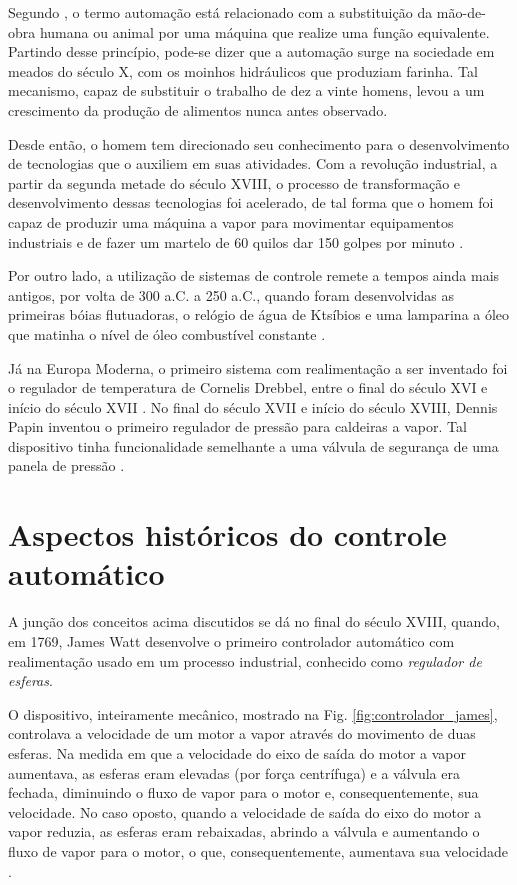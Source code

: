 \label{cap:introducao}

Segundo , o termo automação está relacionado com a
substituição da mão-de-obra humana ou animal por uma máquina que realize uma
função equivalente. Partindo desse princípio, pode-se dizer que a automação
surge na sociedade em meados do século X, com os moinhos hidráulicos que
produziam farinha. Tal mecanismo, capaz de substituir o trabalho de dez a vinte
homens, levou a um crescimento da produção de alimentos nunca antes observado.

Desde então, o homem tem direcionado seu conhecimento para o desenvolvimento de
tecnologias que o auxiliem em suas atividades. Com a revolução industrial, a
partir da segunda metade do século XVIII, o processo de transformação e
desenvolvimento dessas tecnologias foi acelerado, de tal forma que o homem foi
capaz de produzir uma máquina a vapor para movimentar equipamentos industriais e
de fazer um martelo de 60 quilos dar 150 golpes por minuto \cite{goeking:2010}.

Por outro lado, a utilização de sistemas de controle remete a tempos ainda mais
antigos, por volta de 300 a.C. a 250 a.C., quando foram desenvolvidas as
primeiras bóias flutuadoras, o relógio de água de Ktsíbios e uma lamparina a
óleo que matinha o nível de óleo combustível constante
\cite{mayr:1970,mayr:1971,mayr:1975}.

Já na Europa Moderna, o primeiro sistema com realimentação a ser inventado foi o
regulador de temperatura de Cornelis Drebbel, entre o final do século XVI e
início do século XVII \cite{mayr:1975}. No final do século XVII e início do
século XVIII, Dennis Papin inventou o primeiro regulador de pressão para
caldeiras a vapor. Tal dispositivo tinha funcionalidade semelhante a uma válvula
de segurança de uma panela de pressão \cite{dorf:2009}. 

\section{Aspectos históricos do controle automático}
A junção dos conceitos acima discutidos se dá no final do século XVIII, quando,
em 1769, James Watt desenvolve o primeiro controlador automático com
realimentação usado em um processo industrial, conhecido como {\it regulador de
esferas}.

O dispositivo, inteiramente mecânico, mostrado na Fig.
\ref{fig:controlador_james}, controlava a velocidade de um motor a vapor através
do movimento de duas esferas. Na medida em que a velocidade do eixo de saída do
motor a vapor aumentava, as esferas eram elevadas (por força centrífuga) e a
válvula era fechada, diminuindo o fluxo de vapor para o motor e,
consequentemente, sua velocidade. No caso oposto, quando a velocidade de saída
do eixo do motor a vapor reduzia, as esferas eram rebaixadas, abrindo a válvula
e aumentando o fluxo de vapor para o motor, o que, consequentemente, aumentava
sua velocidade \cite{mayr:1970,mayr:1975,dorf:2009}.

